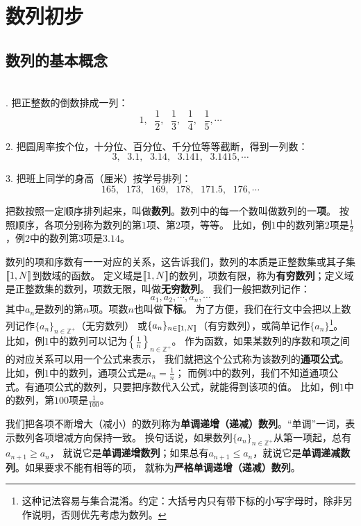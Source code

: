 \documentclass[12pt,UTF8,fontset=none]{ctexbook}
\begin{document}
\chapter{数列初步}

\section{数列的基本概念}

\begin{ex}
    \mbox{}\\
    . 把正整数的倒数排成一列：
$$ 1,\;\,\, \frac{1}{2}, \;\,\, \frac{1}{3}, \;\,\,\frac{1}{4}, \;\,\,\frac{1}{5}, \cdots $$

2. 把圆周率按个位，十分位、百分位、千分位等等截断，得到一列数：
$$  3,\;\,\, 3.1,\;\,\, 3.14,\;\,\, 3.141,\;\,\, 3.1415, \cdots   $$

    3. 把班上同学的身高（厘米）按学号排列：
$$ 165,\;\,\, 173,\;\,\, 169,\;\,\, 178, \;\,\,171.5,\;\,\, 176, \cdots  $$
\end{ex}
把数按照一定顺序排列起来，叫做\textbf{数列}。数列中的每一个数叫做数列的一\textbf{项}。
按照顺序，各项分别称为数列的第$1$项、第$2$项，等等。
比如，例$1$中的数列第$2$项是$\frac{1}{2}$，例$2$中的数列第$3$项是$3.14$。

数列的项和序数有一一对应的关系，这告诉我们，数列的本质是正整数集或其子集$[\![1,N]\!]$到数域的函数。
定义域是$[\![1,N]\!]$的数列，项数有限，称为\textbf{有穷数列}；定义域是正整数集的数列，项数无限，叫做\textbf{无穷数列}。
我们一般把数列记作：
$$ a_1, a_2, \cdots, a_n, \cdots $$
其中$a_n$是数列的第$n$项。项数$n$也叫做\textbf{下标}。
为了方便，我们在行文中会把以上数列记作$\{a_n\}_{n\in\mathbb{Z}^+}$（无穷数列）
或$\{a_n\}_{n\in[\![1,N]\!]}$（有穷数列），或简单记作$\{a_n\}$\footnote{这种记法容易与集合混淆。约定：大括号内只有带下标的小写字母时，除非另作说明，否则优先考虑为数列。}。
比如，例$1$中的数列可以记为$\left\{\frac{1}{n}\right\}_{n\in\mathbb{Z}^+}$。
作为函数，如果某数列的序数和项之间的对应关系可以用一个公式来表示，
我们就把这个公式称为该数列的\textbf{通项公式}。比如，例$1$中的数列，通项公式是$a_n = \frac{1}{n}$；
而例$3$中的数列，我们不知道通项公式。有通项公式的数列，只要把序数代入公式，就能得到该项的值。
比如，例$1$中的数列，第$100$项是$\frac{1}{100}$。

我们把各项不断增大（减小）的数列称为\textbf{单调递增（递减）数列}。“单调”一词，表示数列各项增减方向保持一致。
换句话说，如果数列$\{a_n\}_{n\in\mathbb{Z}^+}$从第一项起，总有$a_{n+1} \geqslant a_n$，
就说它是\textbf{单调递增数列}；如果总有$a_{n+1} \leqslant a_n$，就说它是\textbf{单调递减数列}。如果要求不能有相等的项，
就称为\textbf{严格单调递增（递减）数列}。
\end{document}
